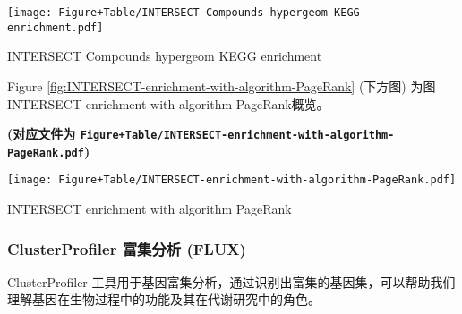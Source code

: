 \documentclass[
]{article}
\begin{document}
\def\@captype{figure}
\begin{center}
\texttt{[image: Figure+Table/INTERSECT-Compounds-hypergeom-KEGG-enrichment.pdf]}
\caption{INTERSECT Compounds hypergeom KEGG enrichment}\label{fig:INTERSECT-Compounds-hypergeom-KEGG-enrichment}
\end{center}

\begin{center}\vspace{1.5cm}\end{center}

\begin{center}\vspace{1.5cm}\end{center}

Figure \ref{fig:INTERSECT-enrichment-with-algorithm-PageRank} (下方图) 为图INTERSECT enrichment with algorithm PageRank概览。

\textbf{(对应文件为 \texttt{Figure+Table/INTERSECT-enrichment-with-algorithm-PageRank.pdf})}

\def\@captype{figure}
\begin{center}
\texttt{[image: Figure+Table/INTERSECT-enrichment-with-algorithm-PageRank.pdf]}
\caption{INTERSECT enrichment with algorithm PageRank}\label{fig:INTERSECT-enrichment-with-algorithm-PageRank}
\end{center}

\begin{center}\vspace{1.5cm}\end{center}

\hypertarget{clusterprofiler-ux5bccux96c6ux5206ux6790-flux}{%
\subsubsection{ClusterProfiler 富集分析 (FLUX)}\label{clusterprofiler-ux5bccux96c6ux5206ux6790-flux}}

ClusterProfiler 工具用于基因富集分析，通过识别出富集的基因集，可以帮助我们理解基因在生物过程中的功能及其在代谢研究中的角色。

\begin{center}\vspace{1.5cm}\end{center}
\end{document}
